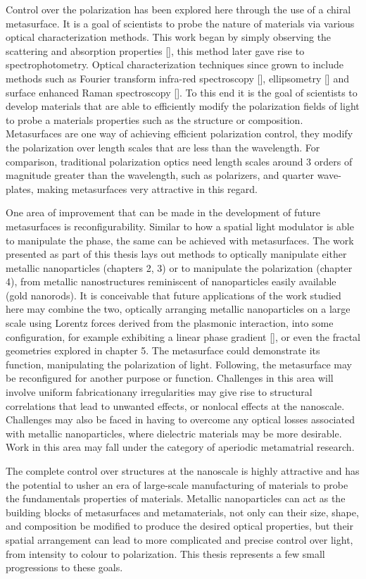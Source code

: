Control over the polarization has been explored here through the use of a chiral metasurface. It is a goal of scientists to probe the nature of materials via various optical characterization methods. This work began by simply observing the scattering and absorption properties [\cite{Mie}], this method later gave rise to spectrophotometry. Optical characterization techniques since grown to include methods such as Fourier transform infra-red spectroscopy [\cite{Chan:2016}], ellipsometry [\cite{Theeten:1981}] and surface enhanced Raman spectroscopy [\cite{Wang:2015}]. To this end it is the goal of scientists to develop materials that are able to efficiently modify the polarization fields of light to probe a materials properties such as the structure or composition. Metasurfaces are one way of achieving efficient polarization control, they modify the polarization over length scales that are less than the wavelength. For comparison, traditional polarization optics need length scales around 3 orders of magnitude greater than the wavelength, such as polarizers, and quarter wave-plates, making metasurfaces very attractive in this regard.

One area of improvement that can be made in the development of future metasurfaces is reconfigurability. Similar to how a spatial light modulator is able to manipulate the phase, the same can be achieved with metasurfaces. The work presented as part of this thesis lays out methods to optically manipulate either metallic nanoparticles (chapters 2, 3) or to manipulate the polarization (chapter 4), from metallic nanostructures reminiscent of nanoparticles easily available (gold nanorods). It is conceivable that future applications of the work studied here may combine the two, optically arranging metallic nanoparticles on a large scale using Lorentz forces derived from the plasmonic interaction, into some configuration, for example exhibiting a linear phase gradient [\cite{Aieta}], or even the fractal geometries explored in chapter 5. The metasurface could demonstrate its function, manipulating the polarization of light. Following, the metasurface may be reconfigured for another purpose or function. Challenges in this area will involve uniform fabrication\textemdash any irregularities may give rise to structural correlations that lead to unwanted effects, or nonlocal effects at the nanoscale. Challenges may also be faced in having to overcome any optical losses associated with metallic nanoparticles, where dielectric materials may be more desirable. Work in this area may fall under the category of aperiodic metamatrial research.

The complete control over structures at the nanoscale is highly attractive and has the potential to usher an era of large-scale manufacturing of materials to probe the fundamentals properties of materials. Metallic nanoparticles can act as the building blocks of metasurfaces and metamaterials, not only can their size, shape, and composition be modified to produce the desired optical properties, but their spatial arrangement can lead to more complicated and precise control over light, from intensity to colour to polarization. This thesis represents a few small progressions to these goals.